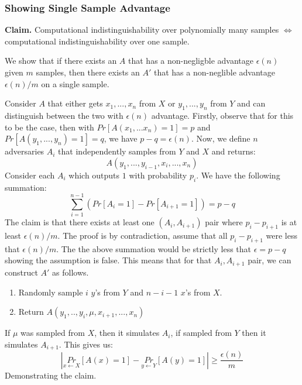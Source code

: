 \documentclass[11pt]{article}
\begin{document}
\subsubsection{Showing Single Sample Advantage}
\textbf{Claim.} Computational indistinguishability over polynomially many samples $\Longleftrightarrow$ computational indistinguishability over one sample.
\vspace{1em}

We show that if there exists an $A$ that has a non-negligble advantage $\epsilon(n)$ given $m$ samples, then there exists an $A'$ that has a non-neglible advantage $\epsilon(n)/m$ on a single sample.
\vspace{1em}

Consider $A$ that either gets $x_1,...,x_n$ from $X$ or $y_1,...,y_n$ from $Y$ and can distinguish between the two with $\epsilon(n)$ advantage. Firstly, observe that for this to be the case, then with $Pr[A(x_1,...x_n) = 1] = p$ and $Pr[A(y_1,...,y_n)=1]=q$, we have $p-q = \epsilon(n)$. Now, we define $n$ adversaries $A_i$ that independently samples from $Y$ and $X$ and returns:
$$A(y_1,...,y_{i-1},x_{i},...,x_n)$$
Consider each $A_i$ which outputs $1$ with probability $p_i$. We have the following summation:
$$\sum_{i=1}^{n-1} (Pr[A_i=1]-Pr[A_{i+1}=1]) = p-q$$
The claim is that there exists at least one $(A_i,A_{i+1})$ pair where $p_i - p_{i+1}$ is at least $\epsilon(n)/m$. The proof is by contradiction, assume that all $p_i - p_{i+1}$ were less that $\epsilon(n)/m$. The the above summation would be strictly less that $\epsilon = p-q$ showing the assumption is false. This means that for that $A_i, A_{i+1}$ pair, we can construct $A'$ as follows.
\begin{enumerate}
    \item Randomly sample $i$ $y$'s from $Y$ and $n-i-1$ $x$'s from $X$.
    \item Return $A(y_1,..,y_{i},\mu,x_{i+1},...,x_n)$
\end{enumerate}
If $\mu$ was sampled from $X$, then it simulates $A_{i}$, if sampled from $Y$ then it simulates $A_{i+1}$. This gives us:
$$|\underset{x \leftarrow X}{Pr}[A(x)=1] - \underset{y\leftarrow Y}{Pr}[A(y)=1]| \geq \frac{\epsilon(n)}{m}$$
Demonstrating the claim.
\end{document}
